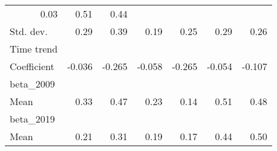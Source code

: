 \begin{tabular}{lllllll}
  \multicolumn{1}{r}{0.03} &
  \multicolumn{1}{r}{0.51} &
  \multicolumn{1}{r}{0.44} \\
\multicolumn{1}{l}{\hspace{1em}Std. dev.} &
  \multicolumn{1}{|r}{0.29} &
  \multicolumn{1}{r}{0.39} &
  \multicolumn{1}{r}{0.19} &
  \multicolumn{1}{r}{0.25} &
  \multicolumn{1}{r}{0.29} &
  \multicolumn{1}{r}{0.26} \\
\multicolumn{1}{l}{Time trend} &
  \multicolumn{1}{|r}{} &
  \multicolumn{1}{r}{} &
  \multicolumn{1}{r}{} &
  \multicolumn{1}{r}{} &
  \multicolumn{1}{r}{} &
  \multicolumn{1}{r}{} \\
\multicolumn{1}{l}{\hspace{1em}Coefficient} &
  \multicolumn{1}{|r}{-0.036} &
  \multicolumn{1}{r}{-0.265} &
  \multicolumn{1}{r}{-0.058} &
  \multicolumn{1}{r}{-0.265} &
  \multicolumn{1}{r}{-0.054} &
  \multicolumn{1}{r}{-0.107} \\
\multicolumn{1}{l}{beta\_2009} &
  \multicolumn{1}{|r}{} &
  \multicolumn{1}{r}{} &
  \multicolumn{1}{r}{} &
  \multicolumn{1}{r}{} &
  \multicolumn{1}{r}{} &
  \multicolumn{1}{r}{} \\
\multicolumn{1}{l}{\hspace{1em}Mean} &
  \multicolumn{1}{|r}{0.33} &
  \multicolumn{1}{r}{0.47} &
  \multicolumn{1}{r}{0.23} &
  \multicolumn{1}{r}{0.14} &
  \multicolumn{1}{r}{0.51} &
  \multicolumn{1}{r}{0.48} \\
\multicolumn{1}{l}{beta\_2019} &
  \multicolumn{1}{|r}{} &
  \multicolumn{1}{r}{} &
  \multicolumn{1}{r}{} &
  \multicolumn{1}{r}{} &
  \multicolumn{1}{r}{} &
  \multicolumn{1}{r}{} \\
\multicolumn{1}{l}{\hspace{1em}Mean} &
  \multicolumn{1}{|r}{0.21} &
  \multicolumn{1}{r}{0.31} &
  \multicolumn{1}{r}{0.19} &
  \multicolumn{1}{r}{0.17} &
  \multicolumn{1}{r}{0.44} &
  \multicolumn{1}{r}{0.50} \\
\cline{1-7}
\end{tabular}
